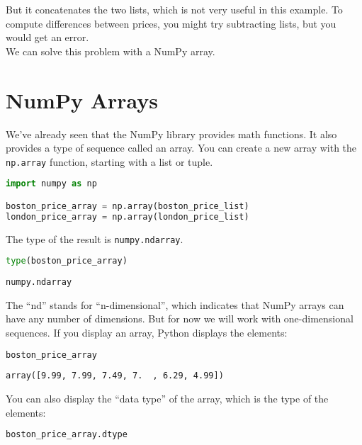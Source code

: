 But it concatenates the two lists, which is not very useful in this
example. To compute differences between prices, you might try
subtracting lists, but you would get an error.\\
We can solve this problem with a NumPy array.

\hypertarget{numpy-arrays}{%
\section{NumPy Arrays}\label{numpy-arrays}}

We've already seen that the NumPy library provides math functions. It
also provides a type of sequence called an array. You can create a new
array with the \passthrough{\lstinline!np.array!} function, starting
with a list or tuple.

\begin{lstlisting}[language=Python,style=source]
import numpy as np

boston_price_array = np.array(boston_price_list)
london_price_array = np.array(london_price_list)
\end{lstlisting}

The type of the result is \passthrough{\lstinline!numpy.ndarray!}.

\begin{lstlisting}[language=Python,style=source]
type(boston_price_array)
\end{lstlisting}

\begin{lstlisting}[style=output]
numpy.ndarray
\end{lstlisting}

The ``nd'' stands for ``n-dimensional'', which indicates that NumPy
arrays can have any number of dimensions. But for now we will work with
one-dimensional sequences. If you display an array, Python displays the
elements:

\begin{lstlisting}[language=Python,style=source]
boston_price_array
\end{lstlisting}

\begin{lstlisting}[style=output]
array([9.99, 7.99, 7.49, 7.  , 6.29, 4.99])
\end{lstlisting}

You can also display the ``data type'' of the array, which is the type
of the elements:

\begin{lstlisting}[language=Python,style=source]
boston_price_array.dtype
\end{lstlisting}

